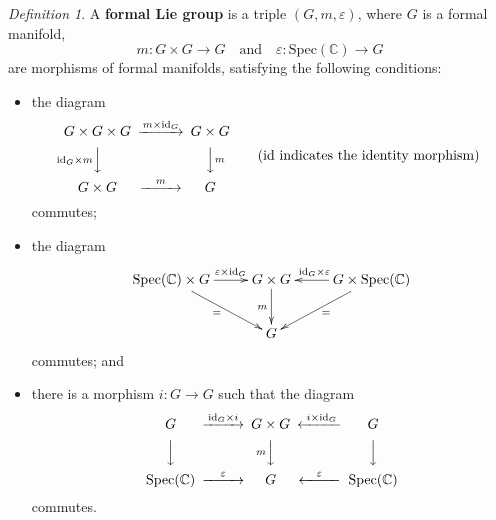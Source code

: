 \documentclass[12pt, a4paper]{amsart}
\newcommand{\BC}{{\mathbb {C}}}
\newcommand{\Spec}{{\mathrm{Spec}}}
\newcommand{\C}{\mathbb{C}}
\newcommand{\be}{\begin {equation}}
\newcommand{\ee}{\end {equation}}
\newcommand{\qaq}{\quad\textrm{and}\quad}
\theoremstyle{Theorem}
\theoremstyle{Theorem}
\theoremstyle{Theorem}
\theoremstyle{Theorem}
\theoremstyle{Plain}
\theoremstyle{remark}
\theoremstyle{remark}
\theoremstyle{Definition}
\newtheorem{dfn}{Definition}[section]
\numberwithin{equation}{section}
\begin{document}
\begin{dfn}\label{df:Lirgroup}
	A \textbf{formal Lie group} is a triple $(G,m,\varepsilon)$, where $G$ is a formal manifold,
    \[m: G\times G\rightarrow G \qaq \varepsilon: \mathrm{Spec}(\C)\rightarrow G \]
      are morphisms of formal manifolds, satisfying the following conditions:
	\begin{itemize}
 \item the diagram \be \label{eq:chainofG}
		\begin{CD}
			G\times G\times G @> m \times \mathrm{id}_G >>  G\times G\\
			@V\mathrm{id}_G\times m VV           @V V mV\\
			G\times G @>m>>  G \\
		\end{CD} \qquad (\textrm{$\mathrm{id}$ indicates the identity morphism})
		\ee commutes;
		\item the diagram  
		\[
		\xymatrix{
			\Spec(\BC)\times G \ar[dr]_= \ar[r]^{\ \ \ \  \varepsilon\times \mathrm{id}_G}        &G\times G \ar[d]_{m} & G\times \Spec(\BC)\ar[l]_{\mathrm{id}_G\times \varepsilon\ \ \ } \ar[dl]^=\\
			& G 
		}
		\]
  commutes; and
		
		\item there is a morphism $i: G\rightarrow G$  such that
		the diagram
	    \be \label{eq:comofi}	\begin{CD}
	    	G @> \mathrm{id}_G\times i >>  G\times G@<\ i\times \mathrm{id}_G <<G\\
	    	@V VV           @Vm V V @VVV\\
	    	\Spec(\BC) @> \varepsilon >>  G @<\varepsilon<<	\Spec(\BC) \\
	    \end{CD} \ee
		commutes.
	\end{itemize}
	
\end{dfn}


\end{document}
